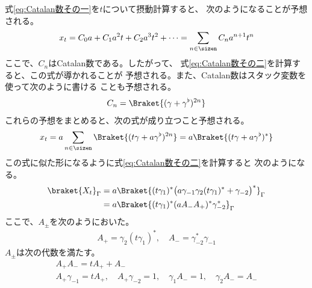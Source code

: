{	\begin{todo}[式の計算]\label{todo:式の計算} %
		式\eqref{eq:Catalan数その一}を$t$について摂動計算すると、
		次のようになることが予想される。
		\begin{equation*}\begin{split}
			x_t = C_0a + C_1a^2t + C_2a^3t^2 + \cdots
			= \sum_{n\in\sizen} C_na^{n+1}t^n
		\end{split}\end{equation*}
		ここで、$C_n$はCatalan数である。したがって、
		式\eqref{eq:Catalan数その二}を計算すると、この式が導かれることが
		予想される。また、Catalan数はスタック変数を使って次のように書ける
		ことも予想される。
		\begin{equation*}\begin{split}
			C_n = \Braket{(\gamma + \gamma^\flat)^{2n}}
		\end{split}\end{equation*}
		これらの予想をまとめると、次の式が成り立つこと予想される。
		\begin{equation*}\begin{split}
			x_t = a\sum_{n\in\sizen}\Braket{(t\gamma + a\gamma^\flat)^{2n}}
			= a\Braket{(t\gamma + a\gamma^\flat)^*}
		\end{split}\end{equation*}
		この式に似た形になるように式\eqref{eq:Catalan数その二}を計算すると
		次のようになる。
		\begin{equation*}\begin{split}
			\braket{X_t}_\Gamma &= a\Braket{(t\gamma_1)^*\bigl(
				a\gamma_{-1}\gamma_2(t\gamma_1)^* + \gamma_{-2}\bigr)^*}_\Gamma \\
			&= a\Braket{(t\gamma_1)^*(aA_-A_+)^*\gamma_{-2}^*}_\Gamma \\
		\end{split}\end{equation*}
		ここで、$A_\pm$を次のようにおいた。
		\begin{equation*}\begin{split}
			A_+ = \gamma_2(t\gamma_1)^*,\quad A_- = \gamma_{-2}^*\gamma_{-1}
		\end{split}\end{equation*}
		$A_\pm$は次の代数を満たす。
		\begin{equation*}\begin{split}
			A_+A_- = tA_+ + A_- \\
			A_+\gamma_{-1} = tA_+,\quad A_+\gamma_{-2} = 1,\quad
			\gamma_1A_- = 1,\quad \gamma_2A_- = A_- \\

\end{split}
\end{equation*}
\end{todo}}
